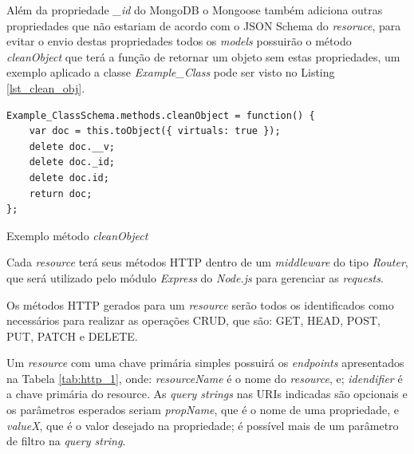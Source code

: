 Além da propriedade \textit{\_id} do MongoDB o Mongoose também adiciona outras propriedades que não estariam de acordo com o JSON Schema do \textit{resoruce}, para evitar o envio destas propriedades todos os \textit{models} possuirão o método \textit{cleanObject} que terá a função de retornar um objeto sem estas propriedades, um exemplo aplicado a classe \textit{Example\_Class} pode ser visto no Listing \ref{lst_clean_obj}.

\begin{listing}
\begin{verbatim}
Example_ClassSchema.methods.cleanObject = function() {
    var doc = this.toObject({ virtuals: true });
    delete doc.__v;
    delete doc._id;
    delete doc.id;
    return doc;
};
\end{verbatim}
\caption{Exemplo método \textit{cleanObject}}
\label{lst_clean_obj}
\end{listing}

\label{sec:bnf:http}

Cada \textit{resource} terá seus métodos HTTP dentro de um \textit{middleware} do tipo \textit{Router}, que será utilizado pelo módulo \textit{Express} do \textit{Node.js} para gerenciar as \textit{requests}.

Os métodos HTTP gerados para um \textit{resource} serão todos os identificados como necessários para realizar as operações CRUD, que são: GET, HEAD, POST, PUT, PATCH e DELETE.

Um \textit{resource} com uma chave primária simples possuirá os \textit{endpoints} apresentados na Tabela \ref{tab:http_1}, onde: \textit{resourceName} é o nome do \textit{resource}, e; \textit{idendifier} é a chave primária do resource. As \textit{query strings} nas URIs indicadas são opcionais e os parâmetros esperados seriam \textit{propName}, que é o nome de uma propriedade, e \textit{valueX}, que é o valor desejado na propriedade; é possível mais de um parâmetro de filtro na \textit{query string}.


